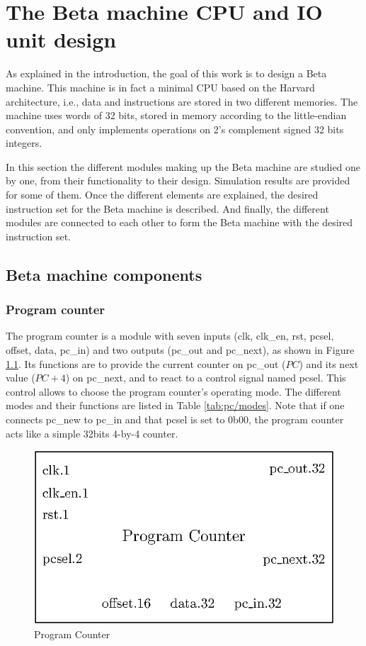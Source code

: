 \chapter{The Beta machine CPU and IO unit design}

As explained in the introduction, the goal of this work is to design a Beta machine. This machine is 
in fact a minimal CPU based on the Harvard architecture, i.e., data and instructions are stored in 
two different memories. The machine uses words of 32 bits, stored in memory according to the little-endian convention, 
and only implements operations on 2's complement signed 32 bits integers. 

In this section the different modules making up the Beta machine are studied one by one, from 
their functionality to their design. Simulation results are provided for some of them. Once the 
different elements are explained, the desired instruction set for the Beta machine is
described. And finally, the different modules are connected to each other to form the Beta
machine with the desired instruction set.

\section{Beta machine components}

\subsection{Program counter}

The program counter is a module with seven inputs (clk, clk\_en, rst, pcsel, offset, data, pc\_in) 
and two outputs (pc\_out and pc\_next), as shown in Figure \ref{fig:components/pc}. 
Its functions are to provide the current counter on pc\_out ($PC$) and its 
next value ($PC + 4$) on pc\_next, and to react to a control signal named pcsel. This control 
allows to choose the program counter's operating mode. The different modes and their functions
are listed in Table \ref{tab:pc/modes}. Note that if one connects pc\_new to pc\_in and that pcsel
is set to 0b00, the program counter acts like a simple 32bits 4-by-4 counter.

\begin{figure}[H]
    \centering
    \includegraphics[scale=0.8]{Chapter3-CPU/res/pc}
    \caption{Program Counter}
    \label{fig:components/pc}
\end{figure}

